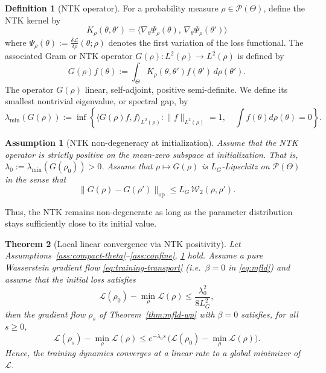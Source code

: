 \documentclass[11pt,a4wide]{article}
\newtheorem{theorem}{Theorem}[section]
\newtheorem{assumption}{Assumption}
\theoremstyle{definition}
\newtheorem{definition}[theorem]{Definition}
\newcommand{\Prob}{\mathcal{P}}
\newcommand{\Wass}{\mathcal{W}}
\begin{document}
\iffalse 
\begin{definition}[NTK operator]
For a probability measure $\rho\in\Prob(\Theta)$, define the NTK kernel by 
$$
K_\rho(\theta, \theta')= \big\langle \nabla_\theta\Psi_\rho(\theta),\,\nabla_\theta\Psi_\rho(\theta')\big\rangle
$$
where $ \Psi_\rho(\theta) := \frac{\delta\mathcal L}{\delta\rho}(\theta;\rho)$ denotes the first variation of the loss functional.   
The associated Gram or NTK operator   $G(\rho):L^2(\rho)\to L^2(\rho)$ is defined by  
\begin{equation}
G(\rho)f(\theta) := \int_\Theta K_\rho(\theta, \theta') f(\theta')\,d\rho(\theta').
\end{equation}
The operator $G(\rho)$ linear, self-adjoint, positive semi-definite. We define its smallest nontrivial eigenvalue, or spectral gap, by
 $$
 \lambda_{\min}(G(\rho)):= \inf\left\{\langle G(\rho)f,f\rangle_{L^2(\rho)} : \|f\|_{L^2(\rho)}=1, \quad \int f(\theta)d\rho(\theta)=0
\right \}.
 $$
\end{definition}

\begin{assumption}[NTK non-degeneracy at initialization]
\label{ass:ntk}
Assume that the NTK operator is strictly positive on the mean-zero subspace at initialization. That is, $\lambda_0 := \lambda_{\min}(G(\rho_0)) > 0$. 
 Assume that $\rho\mapsto G(\rho)$ is $L_G$-Lipschitz on $\Prob(\Theta)$ in the sense that 
 $$
 \|G(\rho)-G(\rho')\|_{\mathrm{op}}\le L_G\,\Wass_2(\rho,\rho').
 $$
\end{assumption}
Thus, the NTK remains non-degenerate as long as the parameter distribution stays sufficiently close to its initial value.
\begin{theorem}[Local linear convergence via NTK positivity]
\label{thm:ntk-conv}
Let Assumptions~\ref{ass:compact-theta}--\ref{ass:confine}, \ref{ass:ntk} hold. Assume a pure Wasserstein gradient flow \eqref{eq:training-transport} (i.e.\ $\beta=0$ in \eqref{eq:mfld}) and assume that  the initial loss satisfies
\begin{equation}
\mathcal L(\rho_0) - \min_\rho \mathcal L(\rho) \le \frac{\lambda_0^2}{8L_G^2},
\end{equation}
then the gradient flow $\rho_s$ of Theorem~\ref{thm:mfld-wp} with $\beta=0$ satisfies, for all $s\ge0$,
\begin{equation}
\mathcal L(\rho_s) - \min_\rho\mathcal L(\rho) \le e^{-\lambda_0 s}\,\big(\mathcal L(\rho_0)-\min_\rho\mathcal L(\rho)\big).
\end{equation}
Hence, the training dynamics converges at a linear rate to a global minimizer of $\mathcal L$.
\end{theorem}
\end{document}
